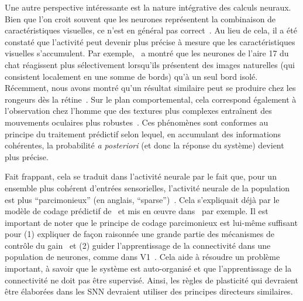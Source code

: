 Une autre perspective intéressante est la nature intégrative des calculs
neuraux. Bien que l'on croit souvent que les neurones représentent la
combinaison de caractéristiques visuelles, ce n'est en général pas
correct~\citep{Tring18}. Au lieu de cela, il a été constaté que
l'activité peut devenir plus précise à mesure que les caractéristiques
visuelles s'accumulent. Par exemple,~\citep{Baudot13} a montré que
les neurones de l'aire 17 du chat réagissent plus sélectivement
lorsqu'ils présentent des images naturelles (qui consistent localement
en une somme de bords) qu'à un seul bord isolé. Récemment,
nous avons montré qu'un résultat similaire peut se produire chez les rongeurs dès
la rétine~\citep{Ravello19}. Sur le plan comportemental, cela correspond
également à l'observation chez l'homme que des textures plus complexes
entraînent des mouvements oculaires plus robustes~\citep{Simoncini12}. Ces phénomènes sont conformes au principe du traitement prédictif
selon lequel, en accumulant des informations cohérentes, la probabilité
\emph{a posteriori} (et donc la réponse du système) devient plus
précise.

Fait frappant, cela se traduit dans l'activité neurale par le fait que,
pour un ensemble plus cohérent d'entrées sensorielles, l'activité neurale de la
population est plus ``parcimonieux'' (en anglais, ``sparse'')~\citep{Vinje02,Baudot13}.
Cela s'expliquait déjà par le modèle de codage prédictif de~\citep{Rao99} et mis en œuvre dans~\citep{Kremkow16} par exemple. Il
est important de noter que le principe de codage parcimonieux est lui-même
suffisant pour (1) expliquer de façon raisonnée une grande partie des
mécanismes de contrôle du gain~\citep{Heeger17}  et (2) guider
l'apprentissage de la connectivité dans une population de neurones,
comme dans V1~\citep{Olshausen97,Perrinet10shl,Perrinet15bicv,Perrinet19hulk}. Cela aide
à résoudre un problème important, à savoir que le système est
auto-organisé et que l'apprentissage de la connectivité ne doit pas être
supervisé. Ainsi, les règles de plasticité qui devraient être élaborées
dans les SNN devraient utiliser des principes directeurs similaires.


